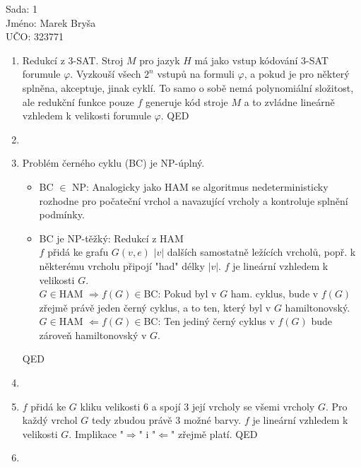 \documentclass[a4wide,12pt]{extarticle}
\begin{document}
\begin{flushleft}
Sada: 1 \\ 
Jméno: Marek Bryša \\
UČO: 323771\\
\end{flushleft}
\begin{enumerate}
  \item
		Redukcí z 3-SAT. Stroj $M$ pro jazyk $H$ má jako vstup kódování 3-SAT forumule $\varphi$. Vyzkouší všech $2^n$ vstupů na formuli $\varphi$, a pokud je pro některý splněna, akceptuje, jinak cyklí. To samo o sobě nemá polynomiální složitost, ale redukční funkce pouze $f$ generuje kód stroje $M$ a to zvládne lineárně vzhledem k velikosti forumule $\varphi$. QED
	\item
	\item
		Problém černého cyklu (BC) je NP-úplný.
		\begin{itemize}
			\item BC $\in$ NP: Analogicky jako HAM se algoritmus nedeterministicky rozhodne pro počateční vrchol a navazující vrcholy a kontroluje splnění podmínky.
			\item
				BC je NP-těžký: Redukcí z HAM\\
				$f$ přidá ke grafu $G(v,e)$ $|v|$ dalších samostatně ležících vrcholů, popř. k některému vrcholu připojí "had" délky $|v|$. $f$ je lineární vzhledem k velikosti $G$.\\
				$G\in$HAM $\Rightarrow f(G)\in$BC: Pokud byl v $G$ ham. cyklus, bude v $f(G)$ zřejmě právě jeden černý cyklus, a to ten, který byl v $G$ hamiltonovský.\\
				$G\in$HAM $\Leftarrow f(G)\in$BC: Ten jediný černý cyklus v $f(G)$ bude zároveň hamiltonovský v $G$.
				
		\end{itemize}
		 QED
	\item
	\item
		$f$ přidá ke $G$ kliku velikosti 6 a spojí 3 její vrcholy se všemi vrcholy $G$. Pro každý vrchol $G$ tedy zbudou právě 3 možné barvy. $f$ je lineární vzhledem k velikosti $G$. Implikace "$\Rightarrow$" i "$\Leftarrow$" zřejmě platí. QED
	\item
		
\end{enumerate}
\end{document}
